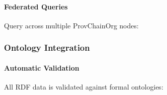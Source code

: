 \documentclass[letterpaper,10pt,english]{sphinxmanual}
\begin{document}
\paragraph{Federated Queries}
\label{\detokenize{foundational/intro-to-rdf-blockchain:federated-queries}}
\sphinxAtStartPar
Query across multiple ProvChainOrg nodes:

\begin{sphinxVerbatim}[commandchars=\\\{\}]
     
    
       
               
\end{sphinxVerbatim}


\subsubsection{Ontology Integration}
\label{\detokenize{foundational/intro-to-rdf-blockchain:ontology-integration}}

\paragraph{Automatic Validation}
\label{\detokenize{foundational/intro-to-rdf-blockchain:automatic-validation}}
\sphinxAtStartPar
All RDF data is validated against formal ontologies:
\end{document}
